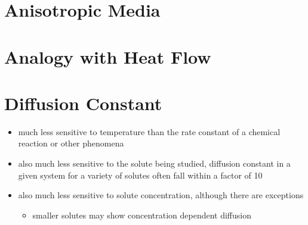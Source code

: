 \documentclass[11pt]{article}
\begin{document}
\section{Anisotropic Media}
\label{sec:org714a654}
\section{Analogy with Heat Flow}
\label{sec:org93b01a6}
\section{Diffusion Constant}
\label{sec:orgad150e5}
\begin{itemize}
\item much less sensitive to temperature than the rate constant of a chemical reaction or other phenomena
\item also much less sensitive to the solute being studied, diffusion constant in a given system for a variety of solutes often fall within a factor of 10
\item also much less sensitive to solute concentration, although there are exceptions
\begin{itemize}
\item smaller solutes may show concentration dependent diffusion
\end{itemize}
\end{itemize}
\end{document}

